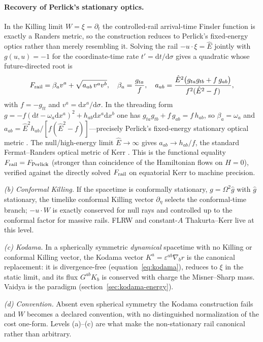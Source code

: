 \documentclass[12pt]{iopart}
\newcommand{\Ehat}{\hat E}
\newcommand{\dd}{\mathrm{d}}
\begin{document}
\paragraph{Recovery of Perlick's stationary optics.} In the Killing limit
$W=\xi=\partial_t$ the controlled-rail arrival-time Finsler function is exactly a
Randers metric, so the construction reduces to Perlick's fixed-energy optics rather
than merely resembling it. Solving the rail $-u\cdot\xi=\Ehat$ jointly with
$g(u,u)=-1$ for the coordinate-time rate $t'=\dd t/\dd\sigma$ gives a quadratic whose
future-directed root is
\begin{equation}
F_{\rm rail}=\beta_a v^a+\sqrt{a_{ab}\,v^a v^b},\quad
\beta_a=\frac{g_{ta}}{f},\quad
a_{ab}=\frac{\Ehat^2\bigl(g_{ta}g_{tb}+f\,g_{ab}\bigr)}{f^2(\Ehat^2-f)},
\label{eq:perlick-randers}
\end{equation}
with $f=-g_{tt}$ and $v^a=\dd x^a/\dd\sigma$. In the threading form
$g=-f(\dd t-\omega_a\dd x^a)^2+h_{ab}\dd x^a\dd x^b$ one has
$g_{ta}g_{tb}+f\,g_{ab}=f\,h_{ab}$, so $\beta_a=\omega_a$ and
$a_{ab}=\Ehat^2 h_{ab}/[f(\Ehat^2-f)]$---precisely Perlick's fixed-energy stationary
optical metric \cite{Perlick1991}. The null/high-energy limit $\Ehat\to\infty$ gives
$a_{ab}\to h_{ab}/f$, the standard Fermat--Randers optical metric of Kerr
\cite{GibbonsWerner2008}. This is the functional equality $F_{\rm rail}=F_{\rm Perlick}$
(stronger than coincidence of the Hamiltonian flows on $H=0$), verified against the
directly solved $F_{\rm rail}$ on equatorial Kerr to machine precision.

\emph{(b) Conformal Killing.} If the spacetime is conformally stationary,
$g=\Omega^2\hat g$ with $\hat g$ stationary, the timelike conformal Killing
vector $\partial_\eta$ selects the conformal-time branch; $-u\cdot W$ is exactly
conserved for null rays and controlled up to the conformal factor for massive
rails. FLRW and constant-$A$ Thakurta--Kerr live at this level.

\emph{(c) Kodama.} In a spherically symmetric \emph{dynamical} spacetime with no
Killing or conformal Killing vector, the Kodama vector
$K^a=\varepsilon^{ab}\nabla_b r$ \cite{Kodama1980,Hayward1996} is the canonical
replacement: it is divergence-free (equation~\eqref{eq:kodama}), reduces to $\xi$ in
the static limit, and its flux $G^{ab}K_b$ is conserved with charge the
Misner--Sharp mass. Vaidya is the paradigm (section~\ref{sec:kodama-energy}).

\emph{(d) Convention.} Absent even spherical symmetry the Kodama construction
fails and $W$ becomes a declared convention, with no distinguished normalization
of the cost one-form. Levels (a)--(c) are what make the non-stationary rail
canonical rather than arbitrary.
\end{document}
